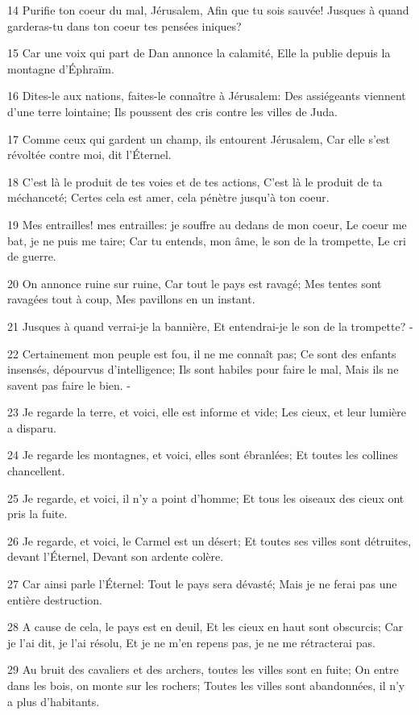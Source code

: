 \par 14 Purifie ton coeur du mal, Jérusalem, Afin que tu sois sauvée! Jusques à quand garderas-tu dans ton coeur tes pensées iniques?
\par 15 Car une voix qui part de Dan annonce la calamité, Elle la publie depuis la montagne d'Éphraïm.
\par 16 Dites-le aux nations, faites-le connaître à Jérusalem: Des assiégeants viennent d'une terre lointaine; Ils poussent des cris contre les villes de Juda.
\par 17 Comme ceux qui gardent un champ, ils entourent Jérusalem, Car elle s'est révoltée contre moi, dit l'Éternel.
\par 18 C'est là le produit de tes voies et de tes actions, C'est là le produit de ta méchanceté; Certes cela est amer, cela pénètre jusqu'à ton coeur.
\par 19 Mes entrailles! mes entrailles: je souffre au dedans de mon coeur, Le coeur me bat, je ne puis me taire; Car tu entends, mon âme, le son de la trompette, Le cri de guerre.
\par 20 On annonce ruine sur ruine, Car tout le pays est ravagé; Mes tentes sont ravagées tout à coup, Mes pavillons en un instant.
\par 21 Jusques à quand verrai-je la bannière, Et entendrai-je le son de la trompette? -
\par 22 Certainement mon peuple est fou, il ne me connaît pas; Ce sont des enfants insensés, dépourvus d'intelligence; Ils sont habiles pour faire le mal, Mais ils ne savent pas faire le bien. -
\par 23 Je regarde la terre, et voici, elle est informe et vide; Les cieux, et leur lumière a disparu.
\par 24 Je regarde les montagnes, et voici, elles sont ébranlées; Et toutes les collines chancellent.
\par 25 Je regarde, et voici, il n'y a point d'homme; Et tous les oiseaux des cieux ont pris la fuite.
\par 26 Je regarde, et voici, le Carmel est un désert; Et toutes ses villes sont détruites, devant l'Éternel, Devant son ardente colère.
\par 27 Car ainsi parle l'Éternel: Tout le pays sera dévasté; Mais je ne ferai pas une entière destruction.
\par 28 A cause de cela, le pays est en deuil, Et les cieux en haut sont obscurcis; Car je l'ai dit, je l'ai résolu, Et je ne m'en repens pas, je ne me rétracterai pas.
\par 29 Au bruit des cavaliers et des archers, toutes les villes sont en fuite; On entre dans les bois, on monte sur les rochers; Toutes les villes sont abandonnées, il n'y a plus d'habitants.
